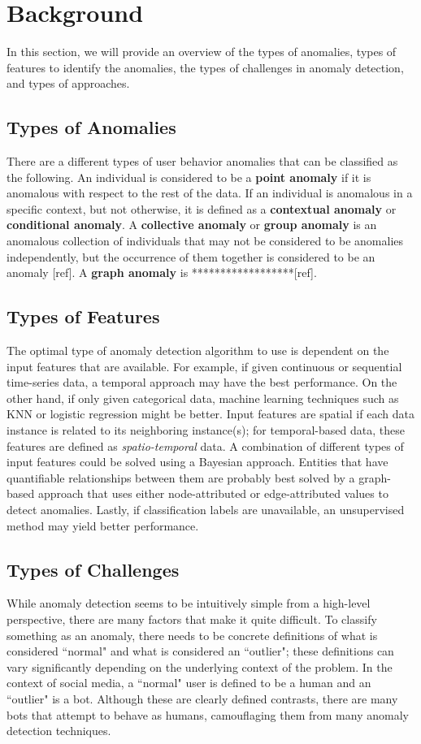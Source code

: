 \documentclass[11pt, oneside]{article}   	%
\begin{document}
\section{Background} \label{background}
In this section, we will provide an overview of the types of anomalies, types of features to identify the anomalies, the types of challenges in anomaly detection, and types of approaches. 

\subsection{Types of Anomalies}
\quad There are a different types of user behavior anomalies that can be classified as the following.
An individual is considered to be a \textbf{point anomaly} if it is anomalous with respect to the rest of the data.
If an individual is anomalous in a specific context, but not otherwise, it is defined as a \textbf{contextual anomaly} or \textbf{conditional anomaly}.
A \textbf{collective anomaly} or \textbf{group anomaly} is an anomalous collection of individuals that may not be considered to be anomalies independently, but the occurrence of them together is considered to be an anomaly [ref]. A \textbf{graph anomaly} is ******************[ref].

\subsection{Types of Features}
\quad The optimal type of anomaly detection algorithm to use is dependent on the input features that are available.
For example, if given continuous or sequential time-series data, a temporal approach may have the best performance.
On the other hand, if only given categorical data, machine learning techniques such as KNN or logistic regression might be better.
Input features are spatial if each data instance is related to its neighboring instance(s); for temporal-based data, these features are defined as \textit{spatio-temporal} data.
A combination of different types of input features could be solved using a Bayesian approach.
Entities that have quantifiable relationships between them are probably best solved by a graph-based approach that uses either node-attributed or edge-attributed values to detect anomalies.
Lastly, if classification labels are unavailable, an unsupervised method may yield better performance.

\subsection{Types of Challenges}
\quad While anomaly detection seems to be intuitively simple from a high-level perspective, there are many factors that make it quite difficult.
To classify something as an anomaly, there needs to be concrete definitions of what is considered ``normal" and what is considered an ``outlier"; these definitions can vary significantly depending on the underlying context of the problem.
In the context of social media, a ``normal" user is defined to be a human and an ``outlier" is a bot.
Although these are clearly defined contrasts, there are many bots that attempt to behave as humans, camouflaging them from many anomaly detection techniques.
\end{document}
